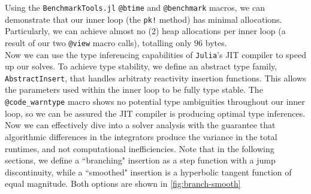 \documentclass[review,onefignum,onetabnum]{siamart171218}
\begin{document}
Using the \texttt{BenchmarkTools.jl} \texttt{@btime} and \texttt{@benchmark} macros,
we can demonstrate that our inner loop (the \texttt{pk!} method) has minimal allocations.
Particularly, we can achieve almost no (2) heap allocations per inner loop (a result of
our two \texttt{@view} macro calls), totalling only $96$ bytes. \\

Now we can use the type inferencing capabilities of \texttt{Julia}'s JIT compiler
to speed up our solves. To achieve type stability, we define an abstract type family,
\texttt{AbstractInsert}, that handles arbitraty reactivity insertion functions.
This allows the parameters used within the inner loop to be fully type stable.
The \texttt{@code\_warntype} macro shows no potential type
ambiguities throughout our inner loop, so we can be assured the JIT compiler is
producing optimal type inferences. \\

%

Now we can effectively dive into a solver analysis with the guarantee that algorithmic
differences in the integrators produce the variance in the total runtimes, and not
computational inefficiencies. Note that in the following sections, we define a
``branching" insertion as a step function with a jump discontinuity, while a
``smoothed" insertion is a hyperbolic tangent function of equal magnitude. Both
options are shown in \cref{fig:branch-smooth}
\end{document}
